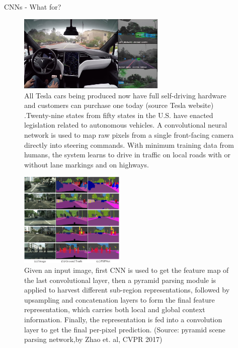 
\begin{vbframe}{CNNs - What for?}
  \begin{figure}
    \centering
    \includegraphics[width=7cm]{figure/tesla_autopilot.jpg}
    \caption{All Tesla cars being produced now have full self-driving hardware and customers can purchase one today (source Tesla website) .Twenty-nine states from fifty states in the U.S. have enacted legislation related to autonomous vehicles. A convolutional neural network is used to map raw pixels from a single front-facing camera directly into steering commands. With minimum training data from humans, the system learns to drive in traffic on local roads with or without lane markings and on highways.}
  \end{figure}
\framebreak

\begin{figure}
    \centering
    \includegraphics[width=5cm]{figure/cityscapes_visual.png}
    \caption{Given an input image, first CNN is used to get the feature map of the last convolutional layer, then a pyramid parsing module is applied to harvest different sub-region representations, followed by upsampling and concatenation layers to form the final feature representation, which carries both local and global context information. Finally, the representation is fed into a convolution layer to get the final per-pixel prediction. (Source: pyramid scene parsing network,by Zhao et. al, CVPR 2017) }
  \end{figure}
\framebreak


\end{vbframe}
